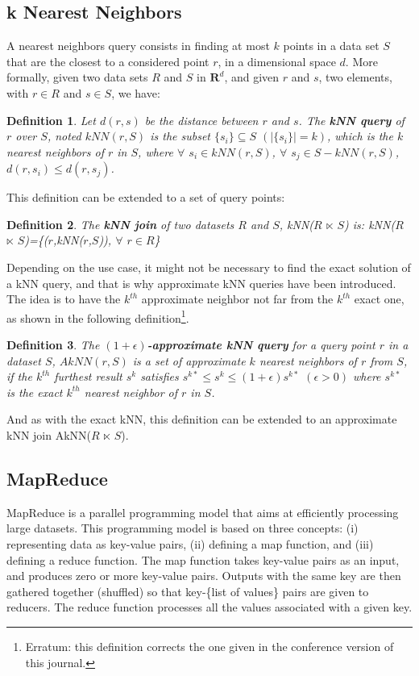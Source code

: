 \documentclass[10pt,journal,compsoc]{IEEEtran}
\newtheorem{myDef}{Definition}
\begin{document}
\subsection{k Nearest Neighbors}
A nearest neighbors query consists in finding at most $k$ points in a data set $S$ that are the closest to a considered point $r$, in a dimensional space $d$. More formally, 
given two data sets $R$ and $S$ in $\mathbf{R}^d$, and given $r$ and $s$, two elements, with $r \in R$ and $s \in S$, we have:
\begin{myDef}
	Let $d(r,s)$ be the distance between $r$ and $s$. The \textbf{kNN query} of $r$ over $S$, noted $kNN(r,S)$ is the subset $\{s_i\} \subseteq S$ $\left(\left|\{s_i\}\right| = k\right)$, which is the $k$ nearest neighbors of $r$ in $S$, where $\forall$ $s_i \in kNN(r,S)$, $\forall$ $s_j \in S-kNN(r,S)$, $d(r,s_i) \leq d(r,s_j)$.
\end{myDef}
This definition can be extended to a set of query points:
\begin{myDef}
	The \textbf{kNN join} of two datasets $R$ and $S$, kNN($R$ $\ltimes$ $S$) is:
	kNN($R$ $\ltimes$ $S$)=\{($r$,kNN($r$,$S$)), $\forall$ $r \in R$\}	
\end{myDef}
Depending on the use case, it might not be necessary to find the exact solution of a kNN query, and that is why approximate kNN queries have been introduced. The idea is to have the $k^{th}$ approximate neighbor not far from the $k^{th}$ exact one, as shown in the following definition\footnote{Erratum: this definition corrects the one given in the conference version of this journal.}. 
\begin{myDef}
    The \textbf{$\left(1+\epsilon\right)$-approximate kNN query} for a query point $r$ in a dataset $S$, $AkNN(r,S)$ is a set of approximate $k$ nearest neighbors of $r$ from $S$, if the $k^{th}$ furthest result $s^{k}$ satisfies $s^{k*} \leq s^{k} \leq (1+\epsilon)s^{k*} $ $(\epsilon > 0)$ where $s^{k*}$ is the exact $k^{th}$ nearest neighbor of $r$ in $S$.
\end{myDef}
And as with the exact kNN, this definition can be extended to an approximate kNN join AkNN($R$ $\ltimes$ $S$).

\subsection{MapReduce}
MapReduce \cite{Dean:2008:MSD:1327452.1327492} is a parallel programming model that aims at efficiently processing large datasets. This programming 
model is based on three concepts: (i) representing data as key-value pairs, (ii) defining a map function, and (iii) defining a reduce function. 
The map function takes key-value pairs as an input, and produces zero or more key-value pairs. Outputs with the same key are then gathered together (shuffled) so that key-\{list of values\} pairs are given to reducers. The reduce function processes all the values associated
with a given key. 
\end{document}
